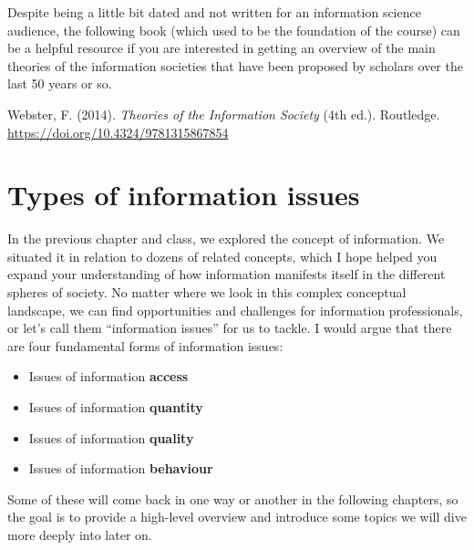 \documentclass[
  letterpaper,
  DIV=11,
  numbers=noendperiod]{scrreprt}
\begin{document}
\begin{tcolorbox}[enhanced jigsaw, arc=.35mm, bottomrule=.15mm, bottomtitle=1mm, breakable, colback=white, colbacktitle=quarto-callout-note-color!10!white, colframe=quarto-callout-note-color-frame, coltitle=black, left=2mm, leftrule=.75mm, opacityback=0, opacitybacktitle=0.6, rightrule=.15mm, title=\textcolor{quarto-callout-note-color}{\faInfo}\hspace{0.5em}{Suggested reading}, titlerule=0mm, toprule=.15mm, toptitle=1mm]

Despite being a little bit dated and not written for an information
science audience, the following book (which used to be the foundation of
the course) can be a helpful resource if you are interested in getting
an overview of the main theories of the information societies that have
been proposed by scholars over the last 50 years or so.

Webster, F. (2014). \emph{Theories of the Information Society} (4th
ed.). Routledge. \url{https://doi.org/10.4324/9781315867854}

\end{tcolorbox}

\section{Types of information issues}\label{types-of-information-issues}

In the previous chapter and class, we explored the concept of
information. We situated it in relation to dozens of related concepts,
which I hope helped you expand your understanding of how information
manifests itself in the different spheres of society. No matter where we
look in this complex conceptual landscape, we can find opportunities and
challenges for information professionals, or let's call them
``information issues'' for us to tackle. I would argue that there are
four fundamental forms of information issues:

\begin{itemize}
\item
  Issues of information \textbf{access}
\item
  Issues of information \textbf{quantity}
\item
  Issues of information \textbf{quality}
\item
  Issues of information \textbf{behaviour}
\end{itemize}

Some of these will come back in one way or another in the following
chapters, so the goal is to provide a high-level overview and introduce
some topics we will dive more deeply into later on.
\end{document}
